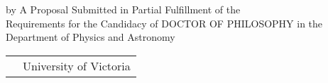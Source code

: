\pagebreak
{
\centering
\thesistitle
\tpbreak
by
\tpbreak
\nameanddegrees
\tpbreak
A Proposal Submitted in Partial Fulfillment of the \\
Requirements for the Candidacy of
\tpbreak
DOCTOR OF PHILOSOPHY
\tpbreak
in the Department of Physics and Astronomy\\
\vfill
\begin{tabular}{cl}
& \phantom{\copyright} University of Victoria
\end{tabular}
\tpbreak
}
\pagebreak
